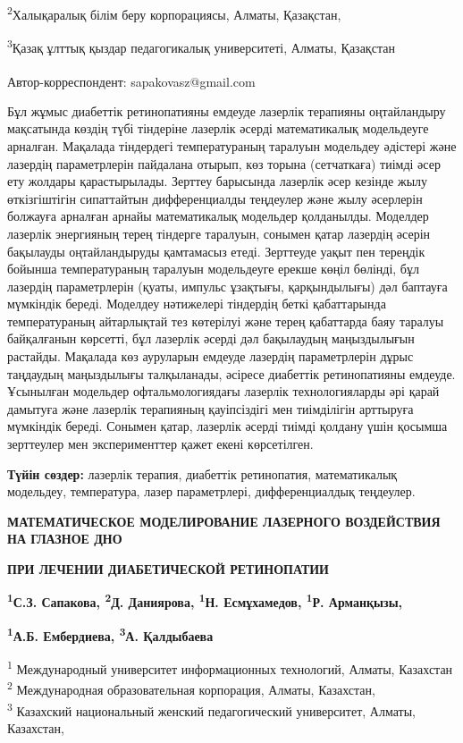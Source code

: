 \textsuperscript{2}Халықаралық білім беру корпорациясы, Алматы,
Қазақстан,

\textsuperscript{3}Қазақ ұлттық қыздар педагогикалық университеті,
Алматы, Қазақстан

\textsuperscript{\envelope }Автор-корреспондент: sapakovasz@gmail.com

Бұл жұмыс диабеттік ретинопатияны емдеуде лазерлік терапияны
оңтайландыру мақсатында көздің түбі тіндеріне лазерлік әсерді
математикалық модельдеуге арналған. Мақалада тіндердегі температураның
таралуын модельдеу әдістері және лазердің параметрлерін пайдалана
отырып, көз торына (сетчаткаға) тиімді әсер ету жолдары қарастырылады.
Зерттеу барысында лазерлік әсер кезінде жылу өткізгіштігін сипаттайтын
дифференциалды теңдеулер және жылу әсерлерін болжауға арналған арнайы
математикалық модельдер қолданылды. Моделдер лазерлік энергияның терең
тіндерге таралуын, сонымен қатар лазердің әсерін бақылауды
оңтайландыруды қамтамасыз етеді. Зерттеуде уақыт пен тереңдік бойынша
температураның таралуын модельдеуге ерекше көңіл бөлінді, бұл лазердің
параметрлерін (қуаты, импульс ұзақтығы, қарқындылығы) дәл баптауға
мүмкіндік береді. Моделдеу нәтижелері тіндердің беткі қабаттарында
температураның айтарлықтай тез көтерілуі және терең қабаттарда баяу
таралуы байқалғанын көрсетті, бұл лазерлік әсерді дәл бақылаудың
маңыздылығын растайды. Мақалада көз ауруларын емдеуде лазердің
параметрлерін дұрыс таңдаудың маңыздылығы талқыланады, әсіресе диабеттік
ретинопатияны емдеуде. Ұсынылған модельдер офтальмологиядағы лазерлік
технологияларды әрі қарай дамытуға және лазерлік терапияның қауіпсіздігі
мен тиімділігін арттыруға мүмкіндік береді. Сонымен қатар, лазерлік
әсерді тиімді қолдану үшін қосымша зерттеулер мен эксперименттер қажет
екені көрсетілген.

{\bfseries Түйін сөздер:} лазерлік терапия, диабеттік ретинопатия,
математикалық модельдеу, температура, лазер параметрлері,
дифференциалдық теңдеулер.

{\bfseries МАТЕМАТИЧЕСКОЕ МОДЕЛИРОВАНИЕ ЛАЗЕРНОГО ВОЗДЕЙСТВИЯ НА ГЛАЗНОЕ
ДНО}

{\bfseries ПРИ ЛЕЧЕНИИ ДИАБЕТИЧЕСКОЙ РЕТИНОПАТИИ}

{\bfseries \textsuperscript{1}С.З. Сапакова\textsuperscript{\envelope },
\textsuperscript{2}Д. Даниярова, \textsuperscript{1}Н. Есмұхамедов,
\textsuperscript{1}Р. Арманқызы,}

{\bfseries \textsuperscript{1}А.Б. Ембердиева, \textsuperscript{3}А.
Қалдыбаева}

\textsuperscript{1} Международный университет информационных технологий,
Алматы, Казахстан\\
\textsuperscript{2} Международная образовательная корпорация, Алматы,
Казахстан,\\
\textsuperscript{3} Казахский национальный женский педагогический
университет, Алматы, Казахстан,

